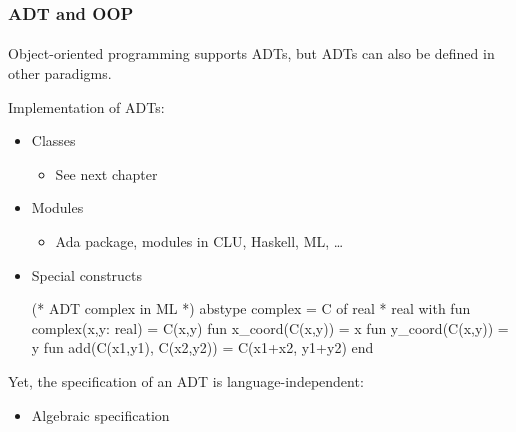 \documentclass{beamer}
\begin{document}
\begin{frame}[fragile]
\frametitle{ADT and OOP}
\framesubtitle{}
Object-oriented programming supports ADTs, but ADTs
can also be defined in other paradigms.
\bigskip

Implementation of ADTs: 
\begin{itemize}
\item Classes
\begin{itemize}
\item See next chapter
\end{itemize}

\item Modules
\begin{itemize}
\item Ada package, modules in CLU, Haskell, ML, \ldots
\end{itemize}

\item Special constructs
\begin{cplus3}
(* ADT complex in ML *)
abstype complex = C of real * real with
    fun complex(x,y: real) = C(x,y)
    fun x_coord(C(x,y)) = x
    fun y_coord(C(x,y)) = y
    fun add(C(x1,y1), C(x2,y2)) = C(x1+x2, y1+y2)
end
\end{cplus3}
\end{itemize}

Yet, the specification of an ADT is language-independent:
\begin{itemize}
\item Algebraic specification 
\end{itemize}
\end{frame}
\end{document}
